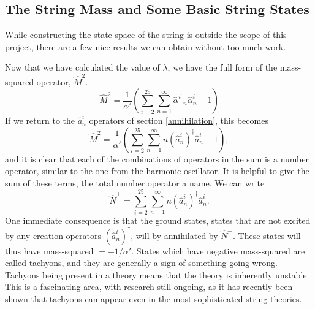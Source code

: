 \documentclass[a4paper,12pt]{article}
\numberwithin{equation}{section}
\begin{document}
\subsection{The String Mass and Some Basic String States}
While constructing the state space of the string is outside the scope of this project, there are a few nice results we can obtain without too much work. 

Now that we have calculated the value of $\lambda$, we have the full form of the mass-squared operator, $\hat{M}^2$.
\begin{equation}
\hat{M}^2 = \frac{1}{\alpha'}\left(\sum_{i=2}^{25}\sum_{n=1}^\infty\hat{\alpha}_{-n}^i\hat{\alpha}_n^i-1\right)
\end{equation}
If we return to the $\hat{a}_n^i$ operators of section \ref{annihilation}, this becomes
\begin{equation}
\hat{M}^2 = \frac{1}{\alpha'}\left(\sum_{i=2}^{25}\sum_{n=1}^\infty n(\hat{a}_{n}^i)^\dagger\hat{a}_n^i-1\right),
\end{equation}
and it is clear that each of the combinations of operators in the sum is a number operator, similar to the one from the harmonic oscillator. It is helpful to give the sum of these terms, the total number operator a name. We can write
\begin{equation}
\hat{N}^\perp = \sum_{i=2}^{25}\sum_{n=1}^\infty n(\hat{a}_n^i)^\dagger\hat{a}_n^i.
\end{equation}
 One immediate consequence is that the ground states, states that are not excited by any creation operators $(\hat{a}_n^i)^\dagger$, will by annihilated by $\hat{N}^\perp$. These states will thus have mass-squared $=-1/\alpha'$. States which have negative mass-squared are called tachyons, and they are generally a sign of something going wrong. Tachyons being present in a theory means that the theory is inherently unstable. This is a fascinating area, with research still ongoing, as it has recently been shown that tachyons can appear even in the most sophisticated string theories.
\end{document}
